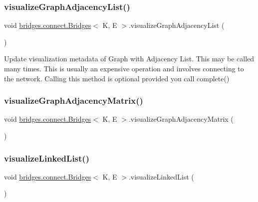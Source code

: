 \subsubsection{\texorpdfstring{visualize\+Graph\+Adjacency\+List()}{visualizeGraphAdjacencyList()}}
{\footnotesize\ttfamily void \hyperlink{classbridges_1_1connect_1_1_bridges}{bridges.\+connect.\+Bridges}$<$ K, E $>$.visualize\+Graph\+Adjacency\+List (\begin{DoxyParamCaption}{ }\end{DoxyParamCaption})\hspace{0.3cm}{\ttfamily [protected]}}

Update visualization metadata of Graph with Adjacency List. This may be called many times. This is usually an expensive operation and involves connecting to the network. Calling this method is optional provided you call complete() \hypertarget{classbridges_1_1connect_1_1_bridges_a13c154c2a656dd4c19f2ff0e767f63c3}{}\label{classbridges_1_1connect_1_1_bridges_a13c154c2a656dd4c19f2ff0e767f63c3} 
\subsubsection{\texorpdfstring{visualize\+Graph\+Adjacency\+Matrix()}{visualizeGraphAdjacencyMatrix()}}
{\footnotesize\ttfamily void \hyperlink{classbridges_1_1connect_1_1_bridges}{bridges.\+connect.\+Bridges}$<$ K, E $>$.visualize\+Graph\+Adjacency\+Matrix (\begin{DoxyParamCaption}{ }\end{DoxyParamCaption})\hspace{0.3cm}{\ttfamily [protected]}}

\hypertarget{classbridges_1_1connect_1_1_bridges_ae9ce2673d2eef1da7f6e1359c494f6fe}{}\label{classbridges_1_1connect_1_1_bridges_ae9ce2673d2eef1da7f6e1359c494f6fe} 
\subsubsection{\texorpdfstring{visualize\+Linked\+List()}{visualizeLinkedList()}}
{\footnotesize\ttfamily void \hyperlink{classbridges_1_1connect_1_1_bridges}{bridges.\+connect.\+Bridges}$<$ K, E $>$.visualize\+Linked\+List (\begin{DoxyParamCaption}{ }\end{DoxyParamCaption})\hspace{0.3cm}{\ttfamily [protected]}}

